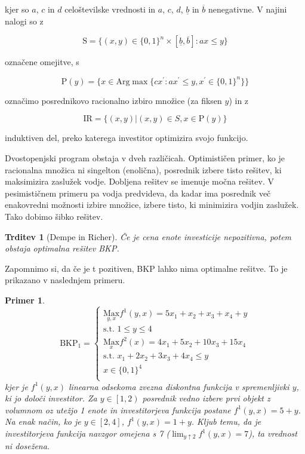 \documentclass[a4paper, 11pt]{article}
\newtheorem{theorem}{Trditev}
\newtheorem{corollary}{Primer}
\begin{document}
	
kjer so $a$, $c$ in $d$ celoštevilske vrednosti in $a$, $c$, $d$, $\underline{b}$ in $\overline{b}$ nenegativne. V najini nalogi so z
	
	$$ \text{S} = \{ (x, y) \in \{ 0, 1 \}^n \times \left[ \underline{b}, \overline{b} \right]: ax \leq y\} $$ 
	
	označene omejitve, s 
	
	$$ \text{P}(y) = \{ x \in \text{Arg}\max \{ cx^\prime: ax^\prime \leq y, x^\prime \in \{ 0,1\}^n \} \}$$
	
	označimo posrednikovo racionalno izbiro množice (za fiksen $y$) in z 
	
	$$ \text{IR} = \{ (x,y)  | (x,y) \in S, x \in \text{P}(y) \} $$
	
	induktiven del, preko katerega investitor optimizira svojo funkcijo.
	
	Dvostopenjski program obstaja v dveh različicah. Optimističen primer, ko je racionalna množica ni singelton (enolična), posrednik izbere tisto rešitev, ki maksimizira zaslužek vodje. Dobljena rešitev se imenuje močna rešitev. V pesimističnem primeru pa vodja predvideva, da kadar ima posrednik več enakovredni možnosti izbire množice, izbere tisto, ki minimizira vodjin zaslužek. Tako dobimo šibko rešitev.
	
	\begin{theorem}[Dempe in Richer]
	Če je cena enote investicije nepozitivna, potem obstaja optimalna rešitev BKP.
	\label{trditev1}
	\end{theorem}
	
	Zapomnimo si, da če je t pozitiven, BKP lahko nima optimalne rešitve. To je prikazano v naslednjem primeru.
	
	\begin{corollary}
	\normalfont
	\[   
	\text{BKP}_1 =
    	\begin{cases}
	 	\text{$\underset{y,x}{\text{Max}} f^{1}(y,x)=5x_1 + x_2 + x_3 + x_4 + y$} \\
       		\text{s.t. $1 \leq y \leq 4$} \\
       		\text{$\underset{x}{\text{Max}} f^{2}(x)=4x_1 + 5x_2 + 10x_3 + 15x_4$} \\
		\text{s.t. $x_1 + 2x_2 + 3x_3 + 4x_4 \leq y $} \\
       		\text{$x \in \{ 0, 1\}^4$} \\
    	\end{cases}
	\]
	kjer je $f^{1}(y,x)$ linearna odsekoma zvezna diskontna funkcija v spremenljivki $y$, ki jo določi investitor. Za $y \in \left[1, 2\right)$ posrednik vedno izbere prvi objekt z volumnom oz utežjo 1 enote in investitorjeva funkcija postane $f^{1}(y,x)= 5 + y$. Na enak način, ko je $y \in \left[2, 4\right]$, $f^{1}(y,x)= 1 + y$. Kljub temu, da je investitorjeva funkcija navzgor omejena s 7 ($ \lim_{y \mathrel{\uparrow} 2} f^1(y, x) = 7 $), ta vrednost ni dosežena.
	\end{corollary}
	
\end{document}
